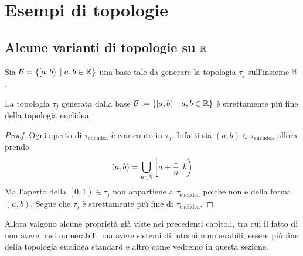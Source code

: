 \chapter{Esempi di topologie}

\section{Alcune varianti di topologie su $\mathbb{R}$}

\begin{defn}
	Sia $\mathcal{B} = \{\left[a,b\right) \; | \; a,b \in \mathbb{R}\}$ una base tale da generare la topologia $\tau_j$ sull'insieme $\mathbb{R}$.
\end{defn}

\begin{theorem}
	La topologia $\tau_j$ generata dalla base $\mathcal{B} := \{ \left[a,b\right) \; | \; a,b\in \mathbb{R} \}$ è strettamente più fine della topologia euclidea. 
\end{theorem}
\begin{proof}
	Ogni aperto di $\tau_{\text{euclidea}}$ è contenuto in $\tau_j$. Infatti sia $(a,b) \in \tau_{\text{euclidea}}$ allora prendo 
	\begin{equation}
	\begin{aligned}
	(a,b) = \bigcup_{n \in \mathbb{N}} \left[a + \frac{1}{n}, b\right)
	\end{aligned}
	\end{equation}
	Ma l'aperto della $\left[0,1\right) \in \tau_j$ non appartiene a $\tau_{\text{euclidea}}$ poiché non è della forma $(a,b)$. Segue che $\tau_j$ è strettamente più fine di $\tau_{\text{euclidea}}$.
\end{proof}

Allora valgono alcune proprietà già viste nei precedenti capitoli, tra cui il fatto di non avere basi numerabili, ma avere sistemi di intorni numberabili; essere più fine della topologia euclidea standard e altro come vedremo in questa sezione.

